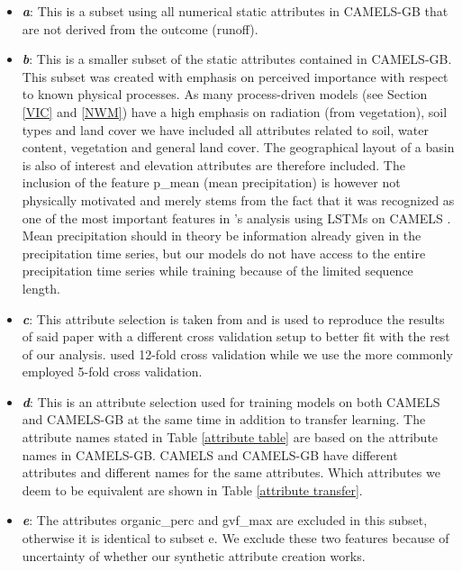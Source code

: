 \begin{itemize}
    \item \textbf{\textit{a}}: This is a subset using all numerical static attributes in CAMELS-GB 
        \citep{CAMELS_GB} that are not derived from the outcome (runoff). 
    \item \textbf{\textit{b}}: This is a smaller subset of the static attributes contained in CAMELS-GB. 
        This subset was created with emphasis on perceived importance with respect 
        to known physical processes. As many process-driven models (see Section \ref{VIC} and \ref{NWM}) have a high 
        emphasis on radiation (from vegetation), soil types and land cover we have 
        included all attributes related to soil, water content, vegetation and general land cover. 
        The geographical layout of a basin is also of interest and elevation attributes 
        are therefore included. The inclusion of the feature p\_mean (mean precipitation)
        is however not 
        physically motivated and merely stems from the fact that it was recognized 
        as one of the most important features in \citet{lstm_second_paper}'s analysis 
        using LSTMs on CAMELS \citep{CAMELS_US}. Mean precipitation should in 
        theory be information already given in the precipitation time series, but 
        our models do not have access to the entire precipitation time series while 
        training because of the limited sequence length. 
    \item \textbf{\textit{c}}: This attribute selection is taken from \cite{lstm_third_paper} and 
        is used to reproduce the results of said paper with a different cross validation 
        setup to better fit with the rest of our analysis. \cite{lstm_third_paper} 
        used 12-fold cross validation while we use the more commonly employed 
        5-fold cross validation. 
    \item \textbf{\textit{d}}: This is an attribute selection used for training models on both 
        CAMELS and CAMELS-GB at the same time in addition to transfer learning. 
        The attribute names stated in Table \ref{attribute table} are based on the 
        attribute names in CAMELS-GB. CAMELS and CAMELS-GB have different attributes 
        and different names for the same attributes. Which attributes we deem to 
        be equivalent are shown in Table \ref{attribute transfer}.
    \item \textbf{\textit{e}}: The attributes organic\_perc and gvf\_max are excluded in this subset, 
        otherwise it is identical to subset e. We exclude these two features because 
        of uncertainty of whether our synthetic attribute creation works.
\end{itemize}

